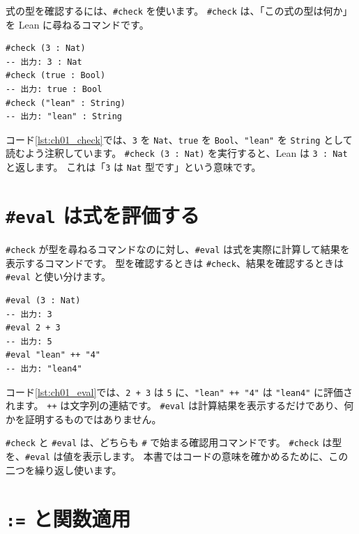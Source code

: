 式の型を確認するには、\texttt{\#check} を使います。
\texttt{\#check} は、「この式の型は何か」を Lean に尋ねるコマンドです。

\begin{listing}[htbp]
\begin{verbatim}
#check (3 : Nat)
-- 出力: 3 : Nat
#check (true : Bool)
-- 出力: true : Bool
#check ("lean" : String)
-- 出力: "lean" : String
\end{verbatim}
\caption{\texttt{:} と \texttt{\#check}}
\label{lst:ch01_check}
\end{listing}

コード\ref{lst:ch01_check}では、\texttt{3} を \texttt{Nat}、\texttt{true} を \texttt{Bool}、\texttt{"lean"} を \texttt{String} として読むよう注釈しています。
\texttt{\#check (3 : Nat)} を実行すると、Lean は \texttt{3 : Nat} と返します。
これは「\texttt{3} は \texttt{Nat} 型です」という意味です。

\section{\texttt{\#eval} は式を評価する}

\texttt{\#check} が型を尋ねるコマンドなのに対し、\texttt{\#eval} は式を実際に計算して結果を表示するコマンドです。
型を確認するときは \texttt{\#check}、結果を確認するときは \texttt{\#eval} と使い分けます。

\begin{listing}[htbp]
\begin{verbatim}
#eval (3 : Nat)
-- 出力: 3
#eval 2 + 3
-- 出力: 5
#eval "lean" ++ "4"
-- 出力: "lean4"
\end{verbatim}
\caption{\texttt{\#eval}}
\label{lst:ch01_eval}
\end{listing}

コード\ref{lst:ch01_eval}では、\texttt{2 + 3} は \texttt{5} に、\texttt{"lean" ++ "4"} は \texttt{"lean4"} に評価されます。
\texttt{++} は文字列の連結です。
\texttt{\#eval} は計算結果を表示するだけであり、何かを証明するものではありません。

\texttt{\#check} と \texttt{\#eval} は、どちらも \texttt{\#} で始まる確認用コマンドです。
\texttt{\#check} は型を、\texttt{\#eval} は値を表示します。
本書ではコードの意味を確かめるために、この二つを繰り返し使います。

\section{\texttt{:=} と関数適用}

